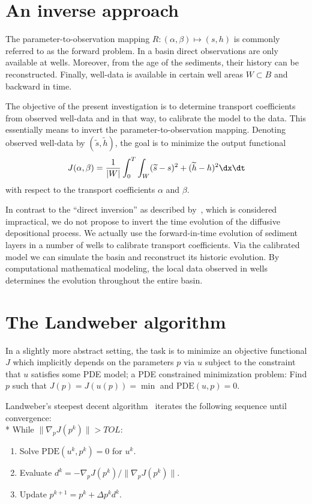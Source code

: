 \section{An inverse approach}

The parameter-to-observation mapping $R: (\alpha, \beta) \mapsto (s,
h)$ is commonly referred to as the forward problem.  In a basin direct
observations are only available at wells. Moreover, from the age of
the sediments, their history can be reconstructed.  Finally, well-data
is available in certain well areas $W \subset B$ and backward in time.

The objective of the present investigation is to determine transport
coefficients from observed well-data and in that way, to calibrate the
model to the data. This essentially means to invert the
parameter-to-observation mapping. Denoting observed well-data by
$(\widetilde s,\widetilde h)$, the goal is to minimize the output
functional
\begin{equation} \label{eq:schroll:output}
 J(\alpha, \beta) =
 \frac{1}{|W|} \int_0^T \int_W (\widetilde s - s)^2 + (\widetilde h - h)^2  \dx \dt
\end{equation}
with respect to the transport coefficients $\alpha$ and $\beta$.

In contrast to the ``direct inversion'' as described
by~\citet{ImhofSharma2007}, which is considered impractical, we do not
propose to invert the time evolution of the diffusive depositional
process.  We actually use the forward-in-time evolution of sediment
layers in a number of wells to calibrate transport coefficients.  Via
the calibrated model we can simulate the basin and reconstruct its
historic evolution. By computational mathematical modeling, the local
data observed in wells determines the evolution throughout the entire
basin.

\section{The Landweber algorithm}

In a slightly more abstract setting, the task is to minimize an
objective functional $J$ which implicitly depends on the parameters
$p$ via $u$ subject to the constraint that $u$ satisfies some PDE
model; a PDE constrained minimization problem: Find $p$ such that
$J(p)=J(u(p))=\min$ and $\mathrm{PDE}(u,p)=0$.

Landweber's steepest decent algorithm~\citep{Landweber1951} iterates the
following sequence until convergence:
\\*
While $\| \nabla_pJ(p^k) \| > TOL$:
\begin{enumerate}
\item Solve $\mathrm{PDE}(u^k,p^k)=0$ for $u^k$.
\item Evaluate $d^k=-\nabla_pJ(p^k) / \| \nabla_pJ(p^k) \|$.
\item Update $p^{k+1}=p^k+\Delta p^k d^k$.
\end{enumerate}

